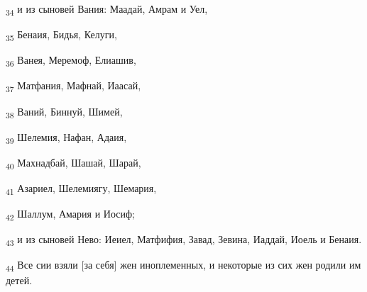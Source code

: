 \begin{tcolorbox}
\textsubscript{34} и из сыновей Вания: Маадай, Амрам и Уел,
\end{tcolorbox}
\begin{tcolorbox}
\textsubscript{35} Бенаия, Бидья, Келуги,
\end{tcolorbox}
\begin{tcolorbox}
\textsubscript{36} Ванея, Меремоф, Елиашив,
\end{tcolorbox}
\begin{tcolorbox}
\textsubscript{37} Матфания, Мафнай, Иаасай,
\end{tcolorbox}
\begin{tcolorbox}
\textsubscript{38} Ваний, Биннуй, Шимей,
\end{tcolorbox}
\begin{tcolorbox}
\textsubscript{39} Шелемия, Нафан, Адаия,
\end{tcolorbox}
\begin{tcolorbox}
\textsubscript{40} Махнадбай, Шашай, Шарай,
\end{tcolorbox}
\begin{tcolorbox}
\textsubscript{41} Азариел, Шелемиягу, Шемария,
\end{tcolorbox}
\begin{tcolorbox}
\textsubscript{42} Шаллум, Амария и Иосиф;
\end{tcolorbox}
\begin{tcolorbox}
\textsubscript{43} и из сыновей Нево: Иеиел, Матфифия, Завад, Зевина, Иаддай, Иоель и Бенаия.
\end{tcolorbox}
\begin{tcolorbox}
\textsubscript{44} Все сии взяли [за себя] жен иноплеменных, и некоторые из сих жен родили им детей.
\end{tcolorbox}
